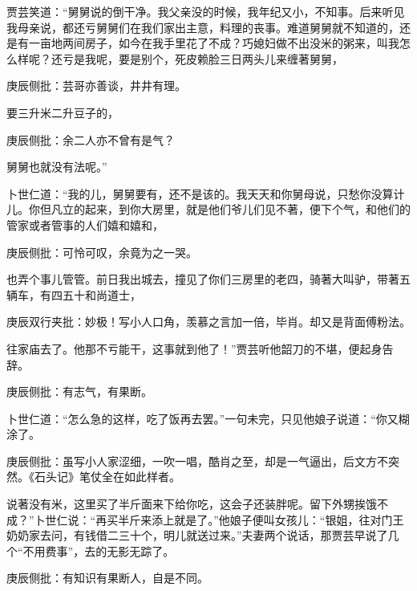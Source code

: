 \begin{parag}
    贾芸笑道：“舅舅说的倒干净。我父亲没的时候，我年纪又小，不知事。后来听见我母亲说，都还亏舅舅们在我们家出主意，料理的丧事。难道舅舅就不知道的，还是有一亩地两间房子，如今在我手里花了不成？巧媳妇做不出没米的粥来，叫我怎么样呢？还亏是我呢，要是别个，死皮赖脸三日两头儿来缠著舅舅，\begin{note}庚辰侧批：芸哥亦善谈，井井有理。\end{note}要三升米二升豆子的，\begin{note}庚辰侧批：余二人亦不曾有是气？\end{note}舅舅也就没有法呢。”
\end{parag}


\begin{parag}
    卜世仁道：“我的儿，舅舅要有，还不是该的。我天天和你舅母说，只愁你没算计儿。你但凡立的起来，到你大房里，就是他们爷儿们见不著，便下个气，和他们的管家或者管事的人们嬉和嬉和，\begin{note}庚辰侧批：可怜可叹，余竟为之一哭。\end{note}也弄个事儿管管。前日我出城去，撞见了你们三房里的老四，骑著大叫驴，带著五辆车，有四五十和尚道士，\begin{note}庚辰双行夹批：妙极！写小人口角，羡慕之言加一倍，毕肖。却又是背面傅粉法。\end{note}往家庙去了。他那不亏能干，这事就到他了！”贾芸听他韶刀的不堪，便起身告辞。\begin{note}庚辰侧批：有志气，有果断。\end{note}卜世仁道：“怎么急的这样，吃了饭再去罢。”一句未完，只见他娘子说道：“你又糊涂了。\begin{note}庚辰侧批：虽写小人家涩细，一吹一唱，酷肖之至，却是一气逼出，后文方不突然。《石头记》笔仗全在如此样者。\end{note}说著没有米，这里买了半斤面来下给你吃，这会子还装胖呢。留下外甥挨饿不成？”卜世仁说：“再买半斤来添上就是了。”他娘子便叫女孩儿：“银姐，往对门王奶奶家去问，有钱借二三十个，明儿就送过来。”夫妻两个说话，那贾芸早说了几个“不用费事”，去的无影无踪了。\begin{note}庚辰侧批：有知识有果断人，自是不同。\end{note}
\end{parag}


